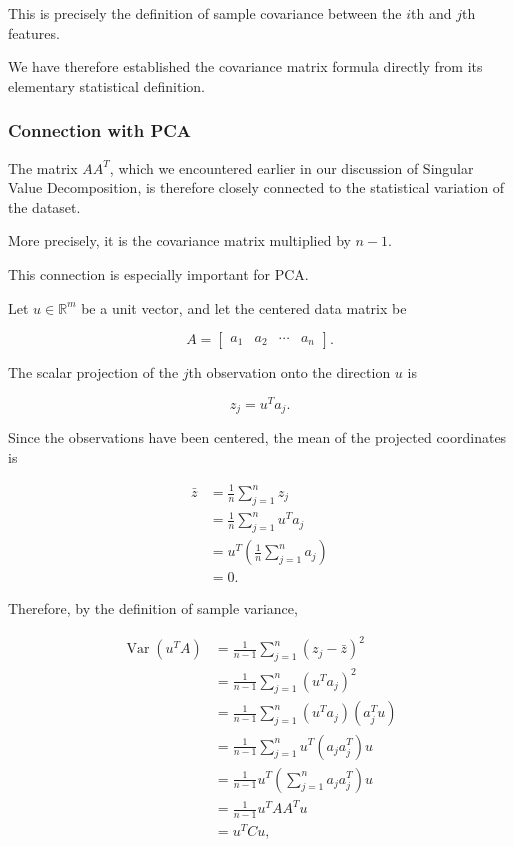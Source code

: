 \documentclass[11pt]{article}
\begin{document}
This is precisely the
definition of sample covariance
between the $i$th and $j$th
features.

We have therefore established
the covariance matrix formula
directly from its elementary
statistical definition.

\subsubsection*{Connection with PCA}

The matrix $AA^T$, which we
encountered earlier in our
discussion of Singular Value
Decomposition, is therefore
closely connected to the
statistical variation of
the dataset.

More precisely, it is the
covariance matrix multiplied
by $n-1$.

This connection is especially
important for PCA.


Let $u\in\mathbb{R}^m$ be a unit vector,
and let the centered data matrix be

\[
A=
\begin{bmatrix}
a_1 & a_2 & \cdots & a_n
\end{bmatrix}.
\]

The scalar projection of the $j$th
observation onto the direction $u$ is

\[
z_j=u^Ta_j.
\]

Since the observations have been centered,
the mean of the projected coordinates is

\[
\begin{aligned}
\bar{z}
&=\frac{1}{n}\sum_{j=1}^{n}z_j\\
&=\frac{1}{n}\sum_{j=1}^{n}u^Ta_j\\
&=u^T\left(\frac{1}{n}
\sum_{j=1}^{n}a_j\right)\\
&=0.
\end{aligned}
\]

Therefore, by the definition of
sample variance,

\[
\begin{aligned}
\operatorname{Var}(u^TA)
&=\frac{1}{n-1}
\sum_{j=1}^{n}(z_j-\bar{z})^2\\[2mm]
&=\frac{1}{n-1}
\sum_{j=1}^{n}(u^Ta_j)^2\\[2mm]
&=\frac{1}{n-1}
\sum_{j=1}^{n}
(u^Ta_j)(a_j^Tu)\\[2mm]
&=\frac{1}{n-1}
\sum_{j=1}^{n}
u^T(a_ja_j^T)u\\[2mm]
&=\frac{1}{n-1}
u^T\left(
\sum_{j=1}^{n}a_ja_j^T
\right)u\\[2mm]
&=\frac{1}{n-1}u^TAA^Tu\\[2mm]
&=u^TCu,
\end{aligned}
\]
\end{document}
